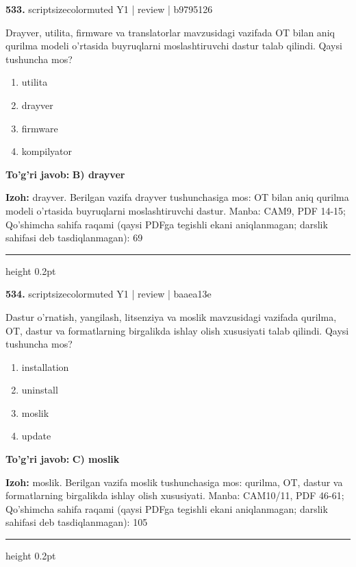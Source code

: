 \documentclass[10pt,a4paper]{article}
\begin{document}
{\bfseries\sffamily\color{ink} 533.} {scriptsizecolor{muted} Y1 | review | b9795126}
\par
Drayver, utilita, firmware va translatorlar mavzusidagi vazifada OT bilan aniq qurilma modeli o'rtasida buyruqlarni moslashtiruvchi dastur talab qilindi. Qaysi tushuncha mos?
\begin{enumerate}[label=\Alph*),leftmargin=9mm]
\item utilita
\item drayver
\item firmware
\item kompilyator
\end{enumerate}
\begin{tcolorbox}[enhanced,breakable,colback=teal!4,colframe=teal!60!black,boxrule=0.45pt,arc=1.2mm,left=2.7mm,right=2.7mm,top=1.8mm,bottom=1.8mm,before skip=2mm,after skip=2mm]
{\bfseries\sffamily\color{teal}To'g'ri javob:} \textbf{B) drayver}
\par\smallskip
{\bfseries Izoh:} drayver. Berilgan vazifa drayver tushunchasiga mos: OT bilan aniq qurilma modeli o'rtasida buyruqlarni moslashtiruvchi dastur. Manba: CAM9, PDF 14-15; Qo'shimcha sahifa raqami (qaysi PDFga tegishli ekani aniqlanmagan; darslik sahifasi deb tasdiqlanmagan): 69
\end{tcolorbox}
\vspace{2mm}\hrule height 0.2pt\vspace{3mm}

{\bfseries\sffamily\color{ink} 534.} {scriptsizecolor{muted} Y1 | review | baaea13e}
\par
Dastur o'rnatish, yangilash, litsenziya va moslik mavzusidagi vazifada qurilma, OT, dastur va formatlarning birgalikda ishlay olish xususiyati talab qilindi. Qaysi tushuncha mos?
\begin{enumerate}[label=\Alph*),leftmargin=9mm]
\item installation
\item uninstall
\item moslik
\item update
\end{enumerate}
\begin{tcolorbox}[enhanced,breakable,colback=teal!4,colframe=teal!60!black,boxrule=0.45pt,arc=1.2mm,left=2.7mm,right=2.7mm,top=1.8mm,bottom=1.8mm,before skip=2mm,after skip=2mm]
{\bfseries\sffamily\color{teal}To'g'ri javob:} \textbf{C) moslik}
\par\smallskip
{\bfseries Izoh:} moslik. Berilgan vazifa moslik tushunchasiga mos: qurilma, OT, dastur va formatlarning birgalikda ishlay olish xususiyati. Manba: CAM10/11, PDF 46-61; Qo'shimcha sahifa raqami (qaysi PDFga tegishli ekani aniqlanmagan; darslik sahifasi deb tasdiqlanmagan): 105
\end{tcolorbox}
\vspace{2mm}\hrule height 0.2pt\vspace{3mm}
\end{document}
